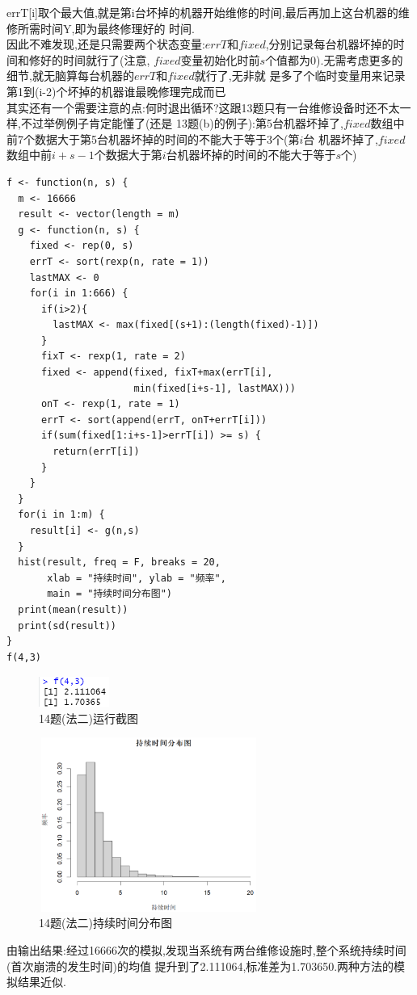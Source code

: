\documentclass{book}
\begin{document}
errT[i]取个最大值,就是第i台坏掉的机器开始维修的时间,最后再加上这台机器的维修所需时间Y,即为最终修理好的
时间. \\
因此不难发现,还是只需要两个状态变量:$errT$和$fixed$,分别记录每台机器坏掉的时间和修好的时间就行了(注意,
$fixed$变量初始化时前$s$个值都为0).无需考虑更多的细节,就无脑算每台机器的$errT$和$fixed$就行了,无非就
是多了个临时变量用来记录第1到(i-2)个坏掉的机器谁最晚修理完成而已  \\
其实还有一个需要注意的点:何时退出循环?这跟13题只有一台维修设备时还不太一样,不过举例例子肯定能懂了(还是
13题(b)的例子):第5台机器坏掉了,$fixed$数组中前7个数据大于第5台机器坏掉的时间的不能大于等于3个(第$i$台
机器坏掉了,$fixed$数组中前$i+s-1$个数据大于第$i$台机器坏掉的时间的不能大于等于$s$个)
\lstset{language = R}
\begin{lstlisting}
f <- function(n, s) {  
  m <- 16666
  result <- vector(length = m)
  g <- function(n, s) {
    fixed <- rep(0, s)
    errT <- sort(rexp(n, rate = 1))
    lastMAX <- 0
    for(i in 1:666) {
      if(i>2){
        lastMAX <- max(fixed[(s+1):(length(fixed)-1)])
      }
      fixT <- rexp(1, rate = 2)
      fixed <- append(fixed, fixT+max(errT[i],
                      min(fixed[i+s-1], lastMAX)))
      onT <- rexp(1, rate = 1)
      errT <- sort(append(errT, onT+errT[i]))
      if(sum(fixed[1:i+s-1]>errT[i]) >= s) {
        return(errT[i])
      }
    }
  }
  for(i in 1:m) {
    result[i] <- g(n,s)
  }
  hist(result, freq = F, breaks = 20, 
       xlab = "持续时间", ylab = "频率", 
       main = "持续时间分布图")
  print(mean(result))
  print(sd(result))
}
f(4,3)
\end{lstlisting}
\begin{figure}[H]
    \centering
    \includegraphics*[height = 1cm, width = 2.3cm]{gramFile/十四题/14题(法二)运行截图.PNG}
    \caption{14题(法二)运行截图}
\end{figure}
\begin{figure}[H]
    \centering
    \includegraphics*[height = 5.7cm, width = 7.2cm]{gramFile/十四题/14题(法二)持续时间分布图.PNG}
    \caption{14题(法二)持续时间分布图}
\end{figure}
\noindent
由输出结果:经过16666次的模拟,发现当系统有两台维修设施时,整个系统持续时间(首次崩溃的发生时间)的均值
提升到了2.111064,标准差为1.703650.两种方法的模拟结果近似. \\
\end{document}
